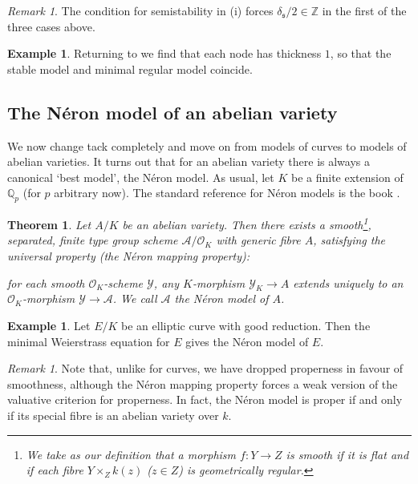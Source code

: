 \documentclass[12pt]{amsart}
\numberwithin{equation}{section}
\newtheorem{theorem}[equation]{Theorem}
\theoremstyle{remark}
\newtheorem{remark}[equation]{Remark}
\theoremstyle{definition}
\newtheorem{example}[equation]{Example}
\theoremstyle{definition}
\theoremstyle{definition}
\theoremstyle{definition}
\theoremstyle{definition}
\theoremstyle{definition}
\begin{document}
\begin{remark}
The condition for semistability in  (i)  forces $\delta_\mathfrak{s}/2\in \mathbb{Z}$ in the first of the three cases above.
\end{remark}

\begin{example}
Returning to  we find that each node has thickness $1$, so that the stable model and minimal regular model coincide.
\end{example}

\subsection{The N\'{e}ron model of an abelian variety} 

We now change tack completely and move on from models of curves to models of abelian varieties. It turns out that for an abelian variety there is always a canonical `best model', the N\'{e}ron model. As usual, let $K$ be a finite extension of $\mathbb{Q}_p$ (for $p$ arbitrary now). The standard reference for N\'{e}ron models is the book \cite{MR1045822}.


\begin{theorem} 
Let $A/K$ be an abelian variety. Then there exists a smooth\footnote{We take as our definition that a morphism $f:Y\rightarrow Z$ is \textit{smooth} if it is flat and if each fibre $Y\times_Z k(z)$ ($z\in Z$) is geometrically regular.}, separated, finite type group scheme $\mathcal{A}/\mathcal{O}_K$ with generic fibre $A$, satisfying the universal property (the \emph{N\'{e}ron mapping property}):

for each smooth $\mathcal{O}_K$-scheme $\mathcal{Y}$, any $K$-morphism $\mathcal{Y}_K\rightarrow A$ extends uniquely to an $\mathcal{O}_K$-morphism $\mathcal{Y}\rightarrow \mathcal{A}$. We call $\mathcal{A}$ the \emph{N\'{e}ron model} of $A$.
\end{theorem} 

\begin{example}
Let $E/K$ be an elliptic curve with good reduction. Then the minimal Weierstrass equation for $E$ gives the N\'{e}ron model of $E$.  
\end{example}

\begin{remark}
Note that, unlike for curves, we have dropped properness in favour of smoothness, although the N\'{e}ron mapping property forces a weak version of the valuative criterion for properness. In fact, the N\'{e}ron model is proper if and only if its special fibre is an abelian variety over $k$.
\end{remark}
\end{document}
